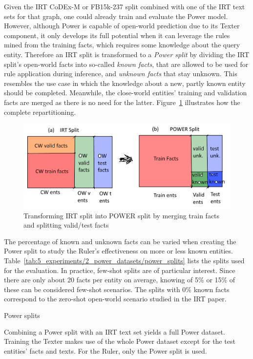 Given the IRT CoDEx-M or FB15k-237 split combined with one of the IRT text sets for that graph, one could already train and evaluate the Power model. However, although Power is capable of open-world prediction due to its Texter component, it only develops its full potential when it can leverage the rules mined from the training facts, which requires some knowledge about the query entity. Therefore an IRT split is transformed to a \emph{Power split} by dividing the IRT split's open-world facts into so-called \emph{known facts}, that are allowed to be used for rule application during inference, and \emph{unknown facts} that stay unknown. This resembles the use case in which the knowledge about a new, partly known entity should be completed. Meanwhile, the close-world entities' training and validation facts are merged as there is no need for the latter. Figure~\ref{fig:5_experiments/2_power_datasets/splits} illustrates how the complete repartitioning.

\begin{figure}[t]
    \centering
    \includegraphics[width=\textwidth]{5_experiments/2_power_datasets/splits}
    \caption{Transforming IRT split into POWER split by merging train facts and splitting valid/test facts}
    \label{fig:5_experiments/2_power_datasets/splits}
\end{figure}

The percentage of known and unknown facts can be varied when creating the Power split to study the Ruler's effectiveness on more or less known entities. Table~\ref{tab:5_experiments/2_power_datasets/power_splits} lists the splits used for the evaluation. In practice, few-shot splits are of particular interest. Since there are only about 20 facts per entity on average, knowing of 5\% or 15\% of these can be considered few-shot scenarios. The splits with 0\% known facts correspond to the zero-shot open-world scenario studied in the IRT paper.

\begin{table}[h]
    \centering
    
    \caption{Power splits}
    \label{tab:5_experiments/2_power_datasets/power_splits}
\end{table}

Combining a Power split with an IRT text set yields a full Power dataset. Training the Texter makes use of the whole Power dataset except for the test entities' facts and texts. For the Ruler, only the Power split is used.
